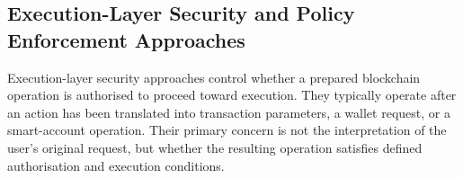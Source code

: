







\subsection{Execution-Layer Security and Policy Enforcement Approaches}
\label{subsec:execution_layer_security}

Execution-layer security approaches control whether a prepared
blockchain operation is authorised to proceed toward execution.
They typically operate after an action has been translated into
transaction parameters, a wallet request, or a smart-account
operation. Their primary concern is not the interpretation of
the user's original request, but whether the resulting operation
satisfies defined authorisation and execution conditions.

